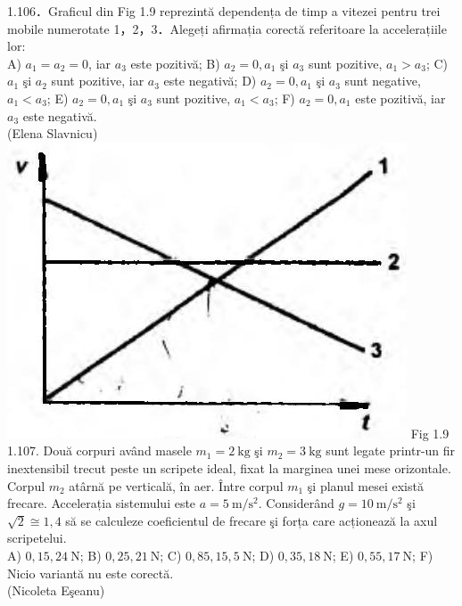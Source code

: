 \documentclass[10pt]{article}
\begin{document}
1.106．Graficul din Fig 1.9 reprezintă dependența de timp a vitezei pentru trei mobile numerotate 1，2，3．Alegeți afirmația corectă referitoare la accelerațiile lor:\\ A) $a_{1}=a_{2}=0$, iar $a_{3}$ este pozitivă; B) $a_{2}=0, a_{1}$ şi $a_{3}$ sunt pozitive, $a_{1}>a_{3}$; C) $a_{1}$ şi $a_{2}$ sunt pozitive, iar $a_{3}$ este negativă; D) $a_{2}=0, a_{1}$ şi $a_{3}$ sunt negative, $a_{1}<a_{3}$; E) $a_{2}=0, a_{1}$ şi $a_{3}$ sunt pozitive, $a_{1}<a_{3}$; F) $a_{2}=0, a_{1}$ este pozitivă, iar $a_{3}$ este negativă.\\ (Elena Slavnicu)\\ \includegraphics[max width=\textwidth, center]{2025_07_01_5b3ff9fa0d508c8e9f17g-025} Fig 1.9\\

1.107. Două corpuri având masele $m_{1}=2 \mathrm{~kg}$ şi $m_{2}=3 \mathrm{~kg}$ sunt legate printr-un fir inextensibil trecut peste un scripete ideal, fixat la marginea unei mese orizontale. Corpul $m_{2}$ atârnă pe verticală, în aer. Între corpul $m_{1}$ şi planul mesei există frecare. Accelerația sistemului este $a=5 \mathrm{~m} / \mathrm{s}^{2}$. Considerând $g=10 \mathrm{~m} / \mathrm{s}^{2}$ şi $\sqrt{2} \cong 1,4$ să se calculeze coeficientul de frecare şi forța care acționează la axul scripetelui.\\ A) $0,15, 24 \mathrm{~N}$; B) $0,25, 21 \mathrm{~N}$; C) $0,85, 15,5 \mathrm{~N}$; D) $0,35, 18 \mathrm{~N}$; E) $0,55, 17 \mathrm{~N}$; F) Nicio variantă nu este corectă.\\ (Nicoleta Eşeanu)\\
\end{document}
